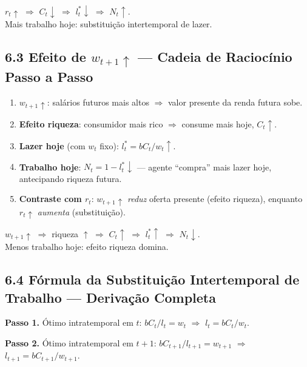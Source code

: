 \documentclass[12pt, a4paper]{article}
\begin{document}
\begin{resultbox}[title={Efeito de $r_t\uparrow$ sobre Oferta de Trabalho}]
$r_t\uparrow$ $\Rightarrow$ $C_t\downarrow$ $\Rightarrow$ $l_t^*\downarrow$ $\Rightarrow$ $N_t\uparrow$.\\
Mais trabalho hoje: substituição intertemporal de lazer.
\end{resultbox}

\subsection*{6.3 Efeito de $w_{t+1}\uparrow$ --- Cadeia de Raciocínio Passo a Passo}

\begin{enumerate}[leftmargin=*, label=\arabic*.]
\item \textbf{$w_{t+1}\uparrow$}: salários futuros mais altos $\Rightarrow$ valor presente da renda futura sobe.
\item \textbf{Efeito riqueza}: consumidor mais rico $\Rightarrow$ consume mais hoje, $C_t\uparrow$.
\item \textbf{Lazer hoje} (com $w_t$ fixo): $l_t^* = bC_t/w_t\uparrow$.
\item \textbf{Trabalho hoje}: $N_t = 1-l_t^*\downarrow$ --- agente ``compra'' mais lazer hoje, antecipando riqueza futura.
\item \textbf{Contraste com $r_t$}: $w_{t+1}\uparrow$ \emph{reduz} oferta presente (efeito riqueza), enquanto $r_t\uparrow$ \emph{aumenta} (substituição).
\end{enumerate}

\begin{resultbox}[title={Efeito de $w_{t+1}\uparrow$ sobre Oferta de Trabalho}]
$w_{t+1}\uparrow$ $\Rightarrow$ riqueza $\uparrow$ $\Rightarrow$ $C_t\uparrow$ $\Rightarrow$ $l_t^*\uparrow$ $\Rightarrow$ $N_t\downarrow$.\\
Menos trabalho hoje: efeito riqueza domina.
\end{resultbox}

\subsection*{6.4 Fórmula da Substituição Intertemporal de Trabalho --- Derivação Completa}

\textbf{Passo 1.} Ótimo intratemporal em $t$: $bC_t/l_t = w_t$ $\Rightarrow$ $l_t = bC_t/w_t$.

\textbf{Passo 2.} Ótimo intratemporal em $t+1$: $bC_{t+1}/l_{t+1} = w_{t+1}$ $\Rightarrow$ $l_{t+1} = bC_{t+1}/w_{t+1}$.
\end{document}
